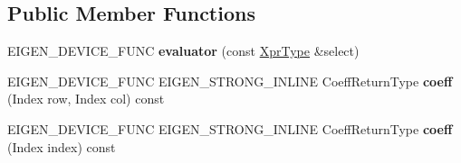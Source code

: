 \subsection*{Public Member Functions}
\begin{DoxyCompactItemize}
\item 
\mbox{\label{struct_eigen_1_1internal_1_1evaluator_3_01_select_3_01_condition_matrix_type_00_01_then_matrix_t0c555ecce04e199df0b1ebada3749ccc_aca0f102155a58a517ffee371fafa8940}} 
E\+I\+G\+E\+N\+\_\+\+D\+E\+V\+I\+C\+E\+\_\+\+F\+U\+NC {\bfseries evaluator} (const \mbox{\hyperlink{class_eigen_1_1_select}{Xpr\+Type}} \&select)
\item 
\mbox{\label{struct_eigen_1_1internal_1_1evaluator_3_01_select_3_01_condition_matrix_type_00_01_then_matrix_t0c555ecce04e199df0b1ebada3749ccc_a7dc417d5fc8b39ba36d03e617efb69a2}} 
E\+I\+G\+E\+N\+\_\+\+D\+E\+V\+I\+C\+E\+\_\+\+F\+U\+NC E\+I\+G\+E\+N\+\_\+\+S\+T\+R\+O\+N\+G\+\_\+\+I\+N\+L\+I\+NE Coeff\+Return\+Type {\bfseries coeff} (Index row, Index col) const
\item 
\mbox{\label{struct_eigen_1_1internal_1_1evaluator_3_01_select_3_01_condition_matrix_type_00_01_then_matrix_t0c555ecce04e199df0b1ebada3749ccc_a7bae584b19ba8d74c0892a9734bf9c6f}} 
E\+I\+G\+E\+N\+\_\+\+D\+E\+V\+I\+C\+E\+\_\+\+F\+U\+NC E\+I\+G\+E\+N\+\_\+\+S\+T\+R\+O\+N\+G\+\_\+\+I\+N\+L\+I\+NE Coeff\+Return\+Type {\bfseries coeff} (Index index) const
\end{DoxyCompactItemize}
